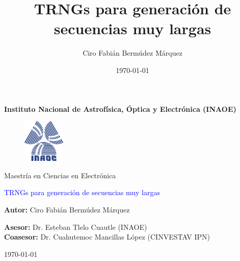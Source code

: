 \documentclass[10pt]{beamer}
\author{Ciro Fabián Bermúdez Márquez}
\title{TRNGs para generación de secuencias muy largas}
\institute{Instituto Nacional de Astrofísica, Óptica y Electrónica}
\date{\today}
\begin{document}
\begin{frame}[plain]
    \selectfont
	\begin{center}
		\textbf{Instituto Nacional de Astrofísica, Óptica y Electrónica (INAOE)}
	\end{center}
	
	\begin{figure}[hbtp]
		\centering
		\includegraphics[width = 2cm]{Inaoe} 
	\end{figure}
	
	\begin{center}
		Maestría en Ciencias en Electrónica
	\end{center}
					
	\begin{center}
		\begin{Large}
		\textcolor{blue}{TRNGs para generación de secuencias muy largas}
		\end{Large}
	\end{center}
	
	\begin{center}
		\textbf{Autor:} Ciro Fabián Bermúdez Márquez
	\end{center}
	
	\begin{flushleft}
		\textbf{Asesor:} Dr. Esteban Tlelo Cuautle (INAOE)\\
	    \textbf{Coasesor:} Dr. Cuahutemoc Mancillas López (CINVESTAV IPN)
	\end{flushleft}
	
	\begin{flushright}
	    \today
	\end{flushright}
\end{frame}


\begin{frame}
    \tableofcontents
\end{frame}

\end{document}
